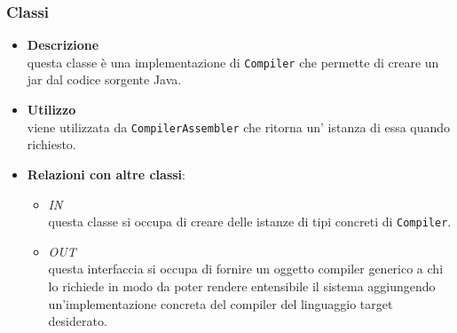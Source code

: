 \subsubsection{Classi}
\label{\nogloxy{swedesigner::server::compiler::java::JavaCompiler}}
\begin{itemize}
\item \textbf{Descrizione}\\
questa classe è una implementazione di \texttt{Compiler} che permette di creare un jar dal codice sorgente Java.
\item \textbf{Utilizzo}\\
viene utilizzata da \texttt{CompilerAssembler} che ritorna un' istanza di essa quando richiesto.
\item \textbf{Relazioni con altre classi}:
\begin{itemize}
\item \textit{IN} \hyperref[\nogloxy{swedesigner::server::compiler::CompilerAssembler}]{}\\
questa classe si occupa di creare delle istanze di tipi concreti di \texttt{Compiler}. 
\item \textit{OUT} \hyperref[\nogloxy{swedesigner::server::compiler::Compiler}]{}\\
questa interfaccia si occupa di fornire un oggetto compiler generico a chi lo richiede in modo da poter rendere entensibile il sistema aggiungendo un'implementazione concreta del compiler del linguaggio target desiderato.
\end{itemize}
\end{itemize}
\subsection{}
\label{\nogloxy{swedesigner::server::controller}}
